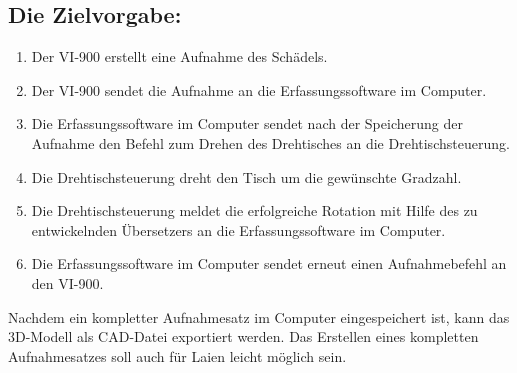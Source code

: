 \subsection{Die Zielvorgabe:}
\begin{enumerate}
\item Der VI-900 erstellt eine Aufnahme des Schädels.
\item Der VI-900 sendet die Aufnahme an die Erfassungssoftware im Computer.
\item Die Erfassungssoftware im Computer sendet nach der Speicherung der Aufnahme den Befehl zum Drehen des Drehtisches an die Drehtischsteuerung.
\item Die Drehtischsteuerung dreht den Tisch um die gewünschte Gradzahl.
\item Die Drehtischsteuerung meldet die erfolgreiche Rotation mit Hilfe des zu entwickelnden Übersetzers an die Erfassungssoftware im Computer.
\item Die Erfassungssoftware im Computer sendet erneut einen Aufnahmebefehl an den VI-900.
\end{enumerate}
Nachdem ein kompletter Aufnahmesatz im Computer eingespeichert ist, kann das 3D-Modell als CAD-Datei exportiert werden.
Das Erstellen eines kompletten Aufnahmesatzes soll auch für Laien leicht möglich sein.\\

